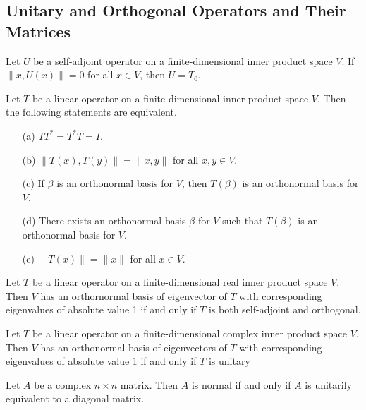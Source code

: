 \subsection{Unitary and Orthogonal Operators and Their Matrices}
\begin{lemma}
    Let \(U\) be a self-adjoint operator on a finite-dimensional inner product space \(V\). If \(\lVert x, U(x) \rVert = 0\) for all \(x \in V\), then \(U = T_0\).
\end{lemma}
\newpage
\begin{theorem}
    Let \(T\) be a linear operator on a finite-dimensional inner product space \(V\). Then the following statements are equivalent.
    \begin{enumerate}
        \item[(a)] \(TT^* = T^*T = I\). 
        \item[(b)] \(\lVert T(x), T(y) \rVert = \lVert x, y \rVert\) for all \(x, y \in V\).
        \item[(c)] If \(\beta\) is an orthonormal basis for \(V\), then \(T(\beta)\) is an orthonormal basis for \(V\).
        \item[(d)] There exists an orthonormal basis \(\beta\) for \(V\) such that \(T(\beta)\) is an orthonormal basis for \(V\).
        \item[(e)] \(\lVert T(x) \rVert = \lVert x \rVert\) for all \(x \in V\).
    \end{enumerate}
\end{theorem}
\newpage
\begin{corollary}
    Let \(T\) be a linear operator on a finite-dimensional real inner product space \(V\). Then \(V\) has an orthornormal basis of eigenvector of \(T\) with corresponding eigenvalues of absolute value 1 if and only if \(T\) is both self-adjoint and orthogonal.
\end{corollary}
\vspace{5cm}
\begin{corollary}
    Let \(T\) be a linear operator on a finite-dimensional complex inner product space \(V\). Then \(V\) has an orthonormal basis of eigenvectors of \(T\) with corresponding eigenvalues of absolute value 1 if and only if \(T\) is unitary
\end{corollary}
\vspace{1cm}
\begin{theorem}
    Let \(A\) be a complex \(n \times n\) matrix. Then \(A\) is normal if and only if \(A\) is unitarily equivalent to a diagonal matrix.
\end{theorem}
